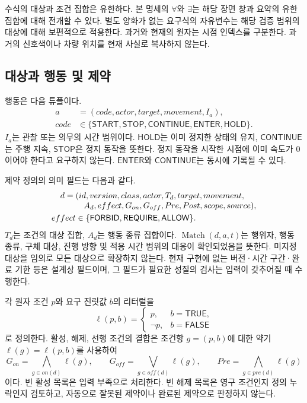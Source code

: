 \documentclass[11pt,a4paper]{article}
\newcommand{\pred}[1]{\mathsf{#1}}
\newcommand{\match}{\operatorname{Match}}
\begin{document}
수식의 대상과 조건 집합은 유한하다.
본 명세의 $\forall$와 $\exists$는 해당 장면 창과 요약의 유한 집합에 대해 전개할 수 있다.
별도 양화가 없는 요구식의 자유변수는 해당 검증 범위의 대상에 대해 보편적으로 적용한다.
과거와 현재의 원자는 시점 인덱스를 구분한다.
과거의 신호색이나 차량 위치를 현재 사실로 복사하지 않는다.

\subsection{대상과 행동 및 제약}
행동은 다음 튜플이다.
\begin{equation}
 \begin{aligned}
 a&=(code,actor,target,movement,I_a),\\
 code&\in\{\pred{START},\pred{STOP},\pred{CONTINUE},\pred{ENTER},\pred{HOLD}\}.
 \end{aligned}
\end{equation}
$I_a$는 관찰 또는 의무의 시간 범위이다.
$\pred{HOLD}$는 이미 정지한 상태의 유지,
$\pred{CONTINUE}$는 주행 지속, $\pred{STOP}$은 정지 동작을 뜻한다.
정지 동작을 시작한 시점에 이미 속도가 0이어야 한다고 요구하지 않는다.
$\pred{ENTER}$와 $\pred{CONTINUE}$는 동시에 기록될 수 있다.

제약 정의의 의미 필드는 다음과 같다.
\begin{align}
 d={}&(id,version,class,actor,T_d,target,movement,\notag\\[-0.3em]
      &\quad A_d,effect,G_{on},G_{off},Pre,Post,scope,source),\label{eq:definition}\\
 effect&\in\{\pred{FORBID},\pred{REQUIRE},\pred{ALLOW}\}.
\end{align}
$T_d$는 조건의 대상 집합, $A_d$는 행동 종류 집합이다.
$\match(d,a,t)$는 행위자, 행동 종류, 구체 대상, 진행 방향 및 적용 시간 범위의 대응이 확인되었음을 뜻한다.
미지정 대상을 임의로 모든 대상으로 확장하지 않는다.
현재 구현에 없는 버전·시간 구간·완료 기한 등은 설계상 필드이며,
그 필드가 필요한 성질의 검사는 입력이 갖추어질 때 수행한다.

각 원자 조건 $p$와 요구 진릿값 $b$의 리터럴을
\begin{equation}
 \ell(p,b)=\begin{cases}p,&b=\pred{TRUE},\\ \neg p,&b=\pred{FALSE}\end{cases}
\end{equation}
로 정의한다. 활성, 해제, 선행 조건의 결합은
조건항 $g=(p,b)$에 대한 약기 $\ell(g)=\ell(p,b)$를 사용하여
\begin{equation}
 G_{on}=\bigwedge_{g\in on(d)}\ell(g),\qquad
 G_{off}=\bigvee_{g\in off(d)}\ell(g),\qquad
 Pre=\bigwedge_{g\in pre(d)}\ell(g)
\end{equation}
이다. 빈 활성 목록은 입력 부족으로 처리한다.
빈 해제 목록은 영구 조건인지 정의 누락인지 검토하고,
자동으로 잘못된 제약이나 완료된 제약으로 판정하지 않는다.
\end{document}
